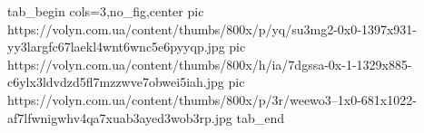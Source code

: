  
 
 
 
 

\ifcmt
  tab_begin cols=3,no_fig,center
     pic https://volyn.com.ua/content/thumbs/800x/p/yq/su3mg2-0x0-1397x931-yy3largfc67laekl4wnt6wnc5e6pyyqp.jpg
		 pic https://volyn.com.ua/content/thumbs/800x/h/ia/7dgssa-0x-1-1329x885-c6ylx3ldvdzd5fl7mzzwve7obwei5iah.jpg
		 pic https://volyn.com.ua/content/thumbs/800x/p/3r/weewo3--1x0-681x1022-af7lfwnigwhv4qa7xuab3ayed3wob3rp.jpg
  tab_end
\fi
